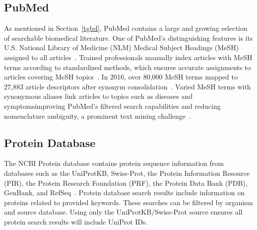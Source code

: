 \documentclass{IEEEtran}
\begin{document}
	\subsection{PubMed}
	As mentioned in Section~\ref{tgbd}, PubMed contains a large and growing selection of searchable biomedical literature. One of PubMed's distinguishing features is its U.S. National Library of Medicine (NLM) Medical Subject Headings (MeSH) assigned to all articles~\cite{mesh15}.  Trained professionals manually index articles with MeSH terms according to standardized methods, which ensures accurate assignments to articles covering MeSH topics~\cite{mesh01}.  In 2016, over 80,000 MeSH terms mapped to 27,883 article descriptors after synonym consolidation~\cite{mesh15}.  Varied MeSH terms with synonymous aliases link articles to topics such as diseases and symptoms\textemdash improving PubMed's filtered search capabilities and reducing nomenclature ambiguity, a prominent text mining challenge~\cite{hsdn}.
	\subsection{Protein Database}
	The NCBI Protein database contains protein sequence information from databases such as the UniProtKB, Swiss-Prot, the Protein Information Resource (PIR), the Protein Research Foundation (PRF), the Protein Data Bank (PDB), GenBank, and RefSeq~\cite{oxford}.  Protein database search results include information on proteins related to provided keywords.  These searches can be filtered by organism and source database.  Using only the UniProtKB/Swiss-Prot source ensures all protein search results will include UniProt IDs.
\end{document}
